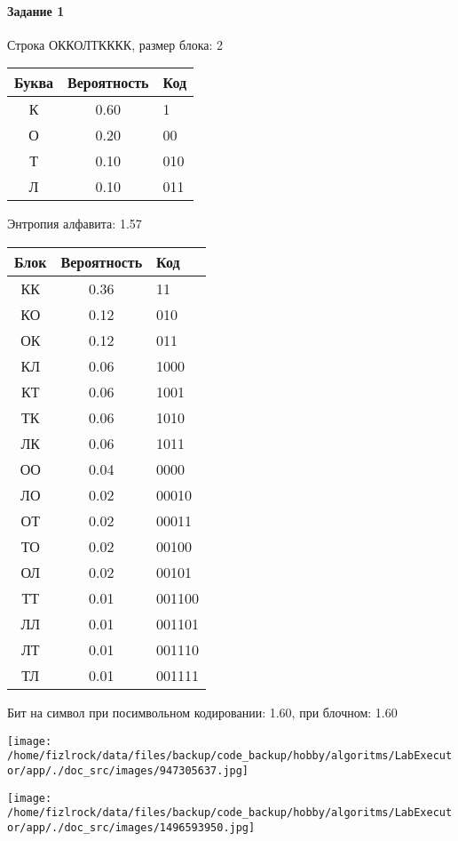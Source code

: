 \documentclass[a4paper, 12pt]{article}
\begin{document}
\paragraph{Задание 1}

Строка ОККОЛТКККК, размер блока: 2
\begin{center}
 \begin{tabular}{ |c|c|l| } 
  \hline
     Буква & Вероятность & Код\\ \hline
К & 0.60 & 1\\\hline
О & 0.20 & 00\\\hline
Т & 0.10 & 010\\\hline
Л & 0.10 & 011
\\ \hline \end{tabular}
\end{center}
Энтропия алфавита: 1.57
\begin{center}
 \begin{tabular}{ |c|c|l| } 
  \hline
     Блок & Вероятность & Код\\ \hline
КК & 0.36 & 11\\\hline
КО & 0.12 & 010\\\hline
ОК & 0.12 & 011\\\hline
КЛ & 0.06 & 1000\\\hline
КТ & 0.06 & 1001\\\hline
ТК & 0.06 & 1010\\\hline
ЛК & 0.06 & 1011\\\hline
ОО & 0.04 & 0000\\\hline
ЛО & 0.02 & 00010\\\hline
ОТ & 0.02 & 00011\\\hline
ТО & 0.02 & 00100\\\hline
ОЛ & 0.02 & 00101\\\hline
ТТ & 0.01 & 001100\\\hline
ЛЛ & 0.01 & 001101\\\hline
ЛТ & 0.01 & 001110\\\hline
ТЛ & 0.01 & 001111
\\ \hline \end{tabular}
\end{center}
Бит на символ при посимвольном кодировании: 1.60, при блочном: 1.60

\texttt{[image: /home/fizlrock/data/files/backup/code\_backup/hobby/algoritms/LabExecutor/app/./doc\_src/images/947305637.jpg]}

\texttt{[image: /home/fizlrock/data/files/backup/code\_backup/hobby/algoritms/LabExecutor/app/./doc\_src/images/1496593950.jpg]}
\pagebreak
\end{document}
